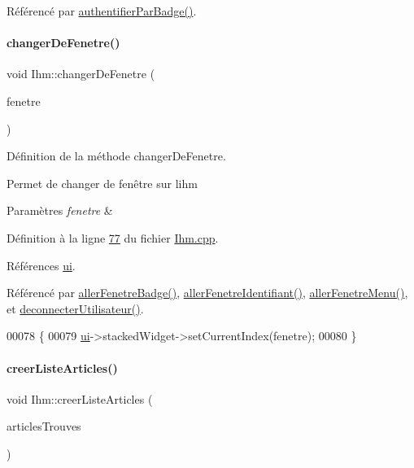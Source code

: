 Référencé par \hyperlink{_ihm_8cpp_source_l00119}{authentifier\+Par\+Badge()}.

\mbox{\label{class_ihm_ab33d5d0a85d60a8d41bae11c34435d50}} 
\paragraph{\texorpdfstring{changer\+De\+Fenetre()}{changerDeFenetre()}}
{\footnotesize\ttfamily void Ihm\+::changer\+De\+Fenetre (\begin{DoxyParamCaption}\item[{int}]{fenetre }\end{DoxyParamCaption})}



Définition de la méthode changer\+De\+Fenetre. 

Permet de changer de fenêtre sur l\textquotesingle{}ihm 
\begin{DoxyParams}{Paramètres}
{\em fenetre} & \\
\hline
\end{DoxyParams}


Définition à la ligne \hyperlink{_ihm_8cpp_source_l00077}{77} du fichier \hyperlink{_ihm_8cpp_source}{Ihm.\+cpp}.



Références \hyperlink{_ihm_8h_source_l00099}{ui}.



Référencé par \hyperlink{_ihm_8cpp_source_l00169}{aller\+Fenetre\+Badge()}, \hyperlink{_ihm_8cpp_source_l00180}{aller\+Fenetre\+Identifiant()}, \hyperlink{_ihm_8cpp_source_l00190}{aller\+Fenetre\+Menu()}, et \hyperlink{_ihm_8cpp_source_l00159}{deconnecter\+Utilisateur()}.


\begin{DoxyCode}
00078 \{
00079     \hyperlink{class_ihm_a0ac5f47856566ceeeca1720109bf70ea}{ui}->stackedWidget->setCurrentIndex(fenetre);
00080 \}
\end{DoxyCode}
\mbox{\label{class_ihm_ab632796a21015964c8d7615edb09261c}} 
\paragraph{\texorpdfstring{creer\+Liste\+Articles()}{creerListeArticles()}}
{\footnotesize\ttfamily void Ihm\+::creer\+Liste\+Articles (\begin{DoxyParamCaption}\item[{const Q\+Vector$<$ Q\+String\+List $>$ \&}]{articles\+Trouves }\end{DoxyParamCaption})\hspace{0.3cm}{\ttfamily [private]}}



